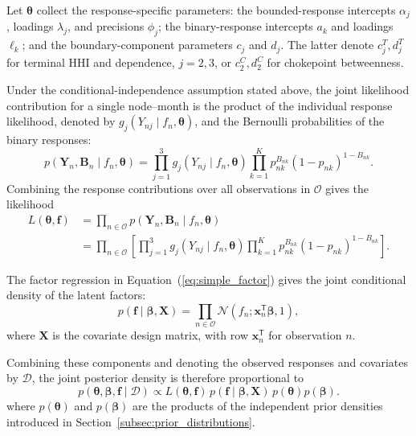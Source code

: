 \documentclass[pdftex,12pt,openright,a4paper,oneside]{book}
\begin{document}
Let $\boldsymbol{\theta}$ collect the response-specific
parameters: the bounded-response intercepts $\alpha_j$,
loadings $\lambda_j$, and precisions $\phi_j$; the
binary-response intercepts $a_k$ and loadings $\ell_k$;
and the boundary-component parameters $c_j$ and $d_j$.
The latter denote $c_j^T,d_j^T$ for terminal HHI and
dependence, $j=2,3$, or $c_2^C,d_2^C$ for chokepoint
betweenness.

Under the conditional-independence assumption stated above,
the joint likelihood contribution for a single
node--month is the product of the individual response likelihood, 
denoted by $g_j(Y_{nj}\mid f_n,\boldsymbol{\theta})$,
and the Bernoulli probabilities of the binary responses:
\begin{equation*}
p(\mathbf{Y}_n,\mathbf{B}_n
  \mid f_n,\boldsymbol{\theta})=
\prod_{j=1}^{3}
g_j(Y_{nj}\mid f_n,\boldsymbol{\theta})
\prod_{k=1}^{K}
p_{nk}^{B_{nk}}
(1-p_{nk})^{1-B_{nk}}.
\end{equation*}
Combining the response contributions over all observations
in $\mathcal{O}$ gives the likelihood
\begin{equation}
\begin{aligned}
L(\boldsymbol{\theta},\mathbf{f})
&=
\prod_{n\in\mathcal{O}}
p(\mathbf{Y}_n,\mathbf{B}_n
  \mid f_n,\boldsymbol{\theta})
\\
&=
\prod_{n\in\mathcal{O}}
\left[
\prod_{j=1}^{3}
g_j(Y_{nj}\mid f_n,\boldsymbol{\theta})
\prod_{k=1}^{K}
p_{nk}^{B_{nk}}
(1-p_{nk})^{1-B_{nk}}
\right].
\end{aligned}
\label{eq:baseline_response_likelihood}
\end{equation}

The factor regression in Equation~(\ref{eq:simple_factor})
gives the joint conditional density of the latent factors:
\begin{equation}
p(\mathbf{f}\mid\boldsymbol{\beta},\mathbf{X})
=
\prod_{n\in\mathcal{O}}
\mathcal{N}\!\left(
f_n;
\boldsymbol{x}_n^{\mathsf T}\boldsymbol{\beta},1
\right),
\end{equation}
where $\mathbf{X}$ is the covariate design matrix,
with row $\boldsymbol{x}_n^{\mathsf T}$ for observation $n$.

Combining these components and denoting the observed
responses and covariates by $\mathcal{D}$, the joint
posterior density is therefore proportional to
\begin{equation}
p(\boldsymbol{\theta},\boldsymbol{\beta},\mathbf{f}
\mid\mathcal{D})
\propto
L(\boldsymbol{\theta},\mathbf{f})
\,p(\mathbf{f}\mid\boldsymbol{\beta},\mathbf{X})
\,p(\boldsymbol{\theta})p(\boldsymbol{\beta}).
\label{eq:joint_posterior}
\end{equation}
where $p(\boldsymbol{\theta})$ and
$p(\boldsymbol{\beta})$ are the products of the independent
prior densities introduced in
Section~\ref{subsec:prior_distributions}.
\end{document}
